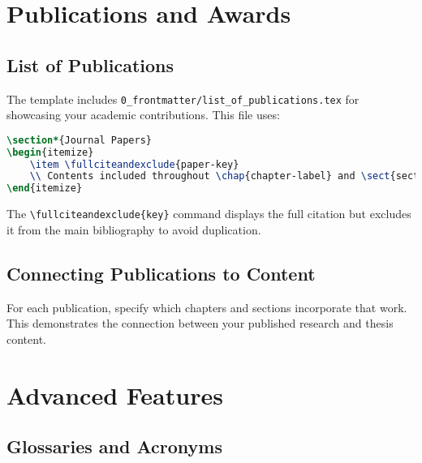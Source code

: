 \section{Publications and Awards}
\label{sect:publications-awards}

\subsection{List of Publications}
\label{sect:list-publications}

The template includes \texttt{0\_frontmatter/list\_of\_publications.tex} for showcasing your academic contributions. This file uses:

\begin{lstlisting}[language=TeX,caption={Publication listing format}]
\section*{Journal Papers}
\begin{itemize}
    \item \fullciteandexclude{paper-key}
    \\ Contents included throughout \chap{chapter-label} and \sect{section-label}.
\end{itemize}
\end{lstlisting}

The \texttt{\textbackslash fullciteandexclude\{key\}} command displays the full citation but excludes it from the main bibliography to avoid duplication.

\subsection{Connecting Publications to Content}
\label{sect:connecting-publications}

For each publication, specify which chapters and sections incorporate that work. This demonstrates the connection between your published research and thesis content.

\section{Advanced Features}
\label{sect:advanced-features}

\subsection{Glossaries and Acronyms}
\label{sect:glossaries}

